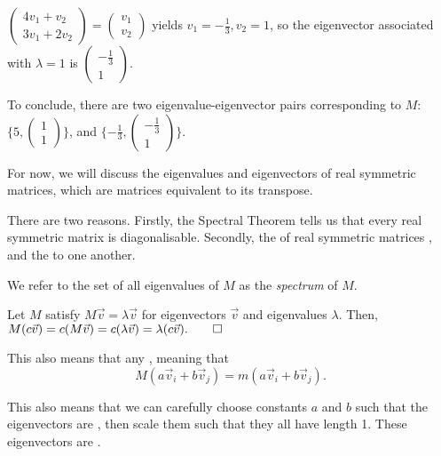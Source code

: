 \documentclass[a4paper, 12pt,oneside,openany]{book}
\begin{document}
{	$\begin{pmatrix} 4v_1+v_2 \\ 3v_1+2v_2 \end{pmatrix} = \begin{pmatrix} v_1 \\ v_2 \end{pmatrix}$ yields $v_1=-\frac{1}{3}, v_2=1$, so the eigenvector associated with $\lambda=1$ is $\begin{pmatrix} -\frac{1}{3}\\1 \end{pmatrix}$.
	
	To conclude, there are two eigenvalue-eigenvector pairs corresponding to $M$: $\{5, \begin{pmatrix} 1\\1 \end{pmatrix} \}$, and $\{-\frac{1}{3}, \begin{pmatrix} -\frac{1}{3}\\1 \end{pmatrix}\}$.
}

For now, we will discuss the eigenvalues and eigenvectors of real symmetric matrices, which are matrices equivalent to its transpose. 

There are two reasons. Firstly, the Spectral Theorem tells us that every real symmetric matrix is diagonalisable. Secondly, the  of real symmetric matrices , and the  to one another.

We refer to the set of all eigenvalues of $M$ as the \emph{spectrum} of $M$.


 Let $M$ satisfy $M\vec{v} = \lambda\vec{v}$ for eigenvectors $\vec{v}$ and eigenvalues $\lambda$. Then, $M(c\vec{v}) = c(M\vec{v}) = c(\lambda \vec{v}) = \lambda (c\vec{v}). \qed$

This also means that any , meaning that $$M(a \vec{v}_i+b\vec{v}_j) =m(a \vec{v}_i+b\vec{v}_j).$$ 

This also means that we can carefully choose constants $a$ and $b$ such that the eigenvectors are , then scale them such that they all have length 1. These eigenvectors are .
\end{document}
